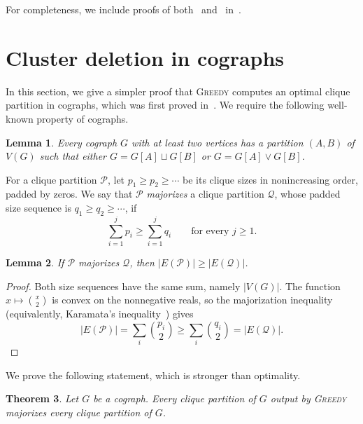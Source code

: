 \documentclass[a4paper,fleqn]{cas-sc}
\newtheorem{thm}{Theorem}[section]
\newtheorem{lem}[thm]{Lemma}
\theoremstyle{remark}
\theoremstyle{plain}
\newcommand{\defn}[1]{\emph{#1}}
\newcommand{\greedy}{{\textsc{Greedy}}}
\begin{document}
For completeness, we include proofs of both~ and~ in~.



\section{Cluster deletion in cographs}
In this section, we give a simpler proof that \greedy{} computes an optimal clique partition in cographs, which was first proved in~\cite{GHN13}. We require the following well-known property of cographs.

\begin{lem} \label{lem:cographpartition}
    Every cograph $G$ with at least two vertices has a partition $(A,B)$ of $V(G)$ such that either $G=G[A] \sqcup G[B]$ or $G=G[A] \vee G[B]$.  
\end{lem}

For a clique partition $\mathcal{P}$, let
$p_1\geq p_2\geq\cdots$ be its clique sizes in nonincreasing order, padded by zeros. We say that $\mathcal{P}$ \defn{majorizes} a clique partition $\mathcal{Q}$, whose padded size sequence is $q_1\geq q_2\geq\cdots$, if
\[
   \sum_{i=1}^j p_i\geq \sum_{i=1}^j q_i
   \qquad\text{for every }j\geq 1.
\]

\begin{lem} \label{lem:partialorder}
If $\mathcal{P}$ majorizes $\mathcal{Q}$, then
$|E(\mathcal{P})|\geq |E(\mathcal{Q})|$.
\end{lem}

\begin{proof}
Both size sequences have the same sum, namely $|V(G)|$. The function
$x\mapsto \binom{x}{2}$ is convex on the nonnegative reals, so the
majorization inequality (equivalently, Karamata's inequality~\cite{MOA11}) gives
\[
   |E(\mathcal{P})|=\sum_i\binom{p_i}{2}
   \geq \sum_i\binom{q_i}{2}=|E(\mathcal{Q})|.
\]
\end{proof}

We prove the following statement, which is stronger than optimality.

\begin{thm} \label{thm:simpercograph}
Let $G$ be a cograph. Every clique partition of $G$ output by
\greedy{} majorizes every clique partition of $G$.
\end{thm}
\end{document}
